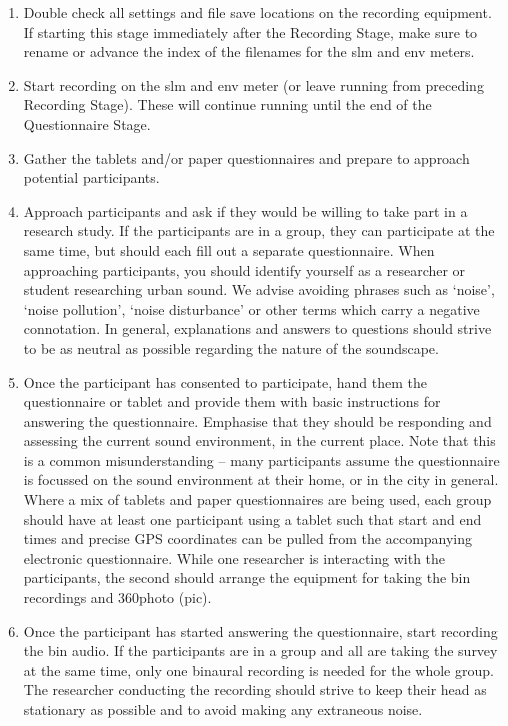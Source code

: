    \begin{enumerate}
     \item Double check all settings and file save locations on the recording equipment. If starting this stage immediately after the Recording Stage, make sure to rename or advance the index of the filenames for the \gls{slm} and \gls{env} meters.
     \item Start recording on the \gls{slm} and \gls{env} meter (or leave running from preceding Recording Stage). These will continue running until the end of the Questionnaire Stage.
     \item Gather the tablets and/or paper questionnaires and prepare to approach potential participants.
     \item Approach participants and ask if they would be willing to take part in a research study. If the participants are in a group, they can participate at the same time, but should each fill out a separate questionnaire. When approaching participants, you should identify yourself as a researcher or student researching urban sound. We advise avoiding phrases such as `noise', `noise pollution', `noise disturbance' or other terms which carry a negative connotation. In general, explanations and answers to questions should strive to be as neutral as possible regarding the nature of the soundscape.
     \item Once the participant has consented to participate, hand them the questionnaire or tablet and provide them with basic instructions for answering the questionnaire. Emphasise that they should be responding and assessing the current sound environment, in the current place. Note that this is a common misunderstanding -- many participants assume the questionnaire is focussed on the sound environment at their home, or in the city in general. Where a mix of tablets and paper questionnaires are being used, each group should have at least one participant using a tablet such that start and end times and precise GPS coordinates can be pulled from the accompanying electronic questionnaire. While one researcher is interacting with the participants, the second should arrange the equipment for taking the \gls{bin} recordings and 360\degree photo (\gls{pic}).
     \item Once the participant has started answering the questionnaire, start recording the \gls{bin} audio. If the participants are in a group and all are taking the survey at the same time, only one binaural recording is needed for the whole group. The researcher conducting the recording should strive to keep their head as stationary as possible and to avoid making any extraneous noise.


\end{enumerate}
